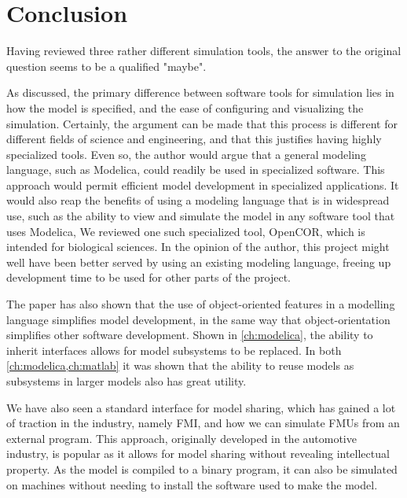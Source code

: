\documentclass[\rootfolder/main.tex]{subfiles}
\begin{document}
\chapter{Conclusion} %

\label{ch:conclusion} %

Having reviewed three rather different simulation tools, the answer to the original question seems to be a qualified "maybe".

As discussed, the primary difference between software tools for simulation lies in how the model is specified, and the ease of configuring and visualizing the simulation.
Certainly, the argument can be made that this process is different for different fields of science and engineering, and that this justifies having highly specialized tools.
Even so, the author would argue that a general modeling language, such as Modelica, could readily be used in specialized software.
This approach would permit efficient model development in specialized applications.
It would also reap the benefits of using a modeling language that is in widespread use, such as the ability to view and simulate the model in any software tool that uses Modelica, 
We reviewed one such specialized tool, OpenCOR, which is intended for biological sciences.
In the opinion of the author, this project might well have been better served by using an existing modeling language, freeing up development time to be used for other parts of the project.

The paper has also shown that the use of object-oriented features in a modelling language simplifies model development, in the same way that object-orientation simplifies other software development.
Shown in \cref{ch:modelica}, the ability to inherit interfaces allows for model subsystems to be replaced.
In both \cref{ch:modelica,ch:matlab} it was shown that the ability to reuse models as subsystems in larger models also has great utility.

We have also seen a standard interface for model sharing, which has gained a lot of traction in the industry, namely FMI, and how we can simulate FMUs from an external program.
This approach, originally developed in the automotive industry, is popular as it allows for model sharing without revealing intellectual property.
As the model is compiled to a binary program, it can also be simulated on machines without needing to install the software used to make the model.
\end{document}
